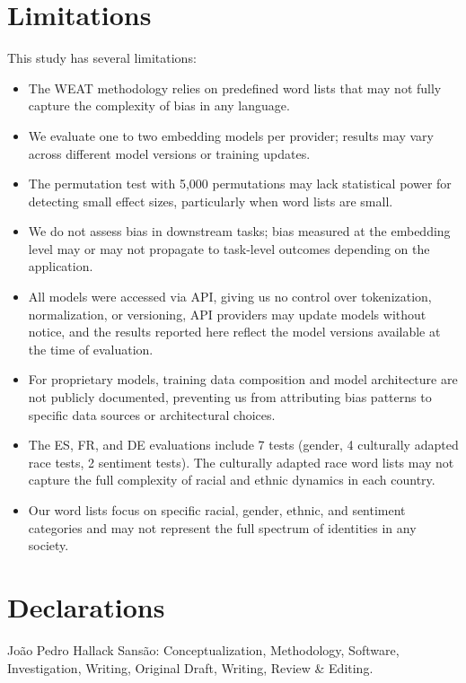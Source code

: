 \documentclass{sbc2019}
\begin{document}
\section{Limitations}

This study has several limitations:

\begin{itemize}[nosep]
    \item The WEAT methodology relies on predefined word lists that may not fully capture the complexity of bias in any language.
    \item We evaluate one to two embedding models per provider; results may vary across different model versions or training updates.
    \item The permutation test with 5,000 permutations may lack statistical power for detecting small effect sizes, particularly when word lists are small.
    \item We do not assess bias in downstream tasks; bias measured at the embedding level may or may not propagate to task-level outcomes depending on the application.
    \item All models were accessed via API, giving us no control over tokenization, normalization, or versioning, API providers may update models without notice, and the results reported here reflect the model versions available at the time of evaluation.
    \item For proprietary models, training data composition and model architecture are not publicly documented, preventing us from attributing bias patterns to specific data sources or architectural choices.
    \item The ES, FR, and DE evaluations include 7 tests (gender, 4 culturally adapted race tests, 2 sentiment tests). The culturally adapted race word lists may not capture the full complexity of racial and ethnic dynamics in each country.
    \item Our word lists focus on specific racial, gender, ethnic, and sentiment categories and may not represent the full spectrum of identities in any society.
\end{itemize}

\section*{Declarations}

\begin{contributions}
João Pedro Hallack Sansão: Conceptualization, Methodology, Software, Investigation, Writing, Original Draft, Writing, Review \& Editing.
\end{contributions}
\end{document}
